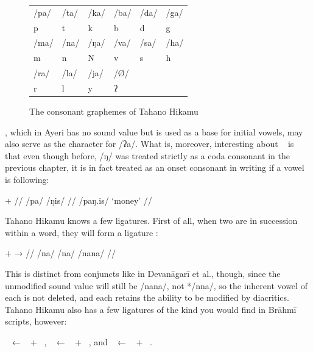 \begin{figure}[ht]
\caption{The consonant graphemes of Tahano Hikamu}

\begin{tabu} to \linewidth{X[c] X[c] X[c] X[c] X[c] X[c]}
\toprule
\tableheaderfont	/pa/ & /ta/ & /ka/ & /ba/ & /da/ & /ga/ \\
\rowfont{\Tagati\huge}	p & t & k & b & d & g \\

\midrule

\tableheaderfont	/ma/ & /na/ & /ŋa/ & /va/ & /sa/ & /ha/ \\
\rowfont{\Tagati\huge}	m & n & N & v & s & h \\

\midrule

\tableheaderfont	/ra/ & /la/ & /ja/ & /Ø/ \\
\rowfont{\Tagati\huge}	r & l & y & ʔ \\

\bottomrule
\end{tabu}
\label{fig:thcons}
\end{figure}

, which in Ayeri has no sound value but is used as a base for initial 
vowels, may also serve as the character for /ʔa/. What is, moreover, 
interesting about ~ is that even though before, /ŋ/ was treated 
strictly as a coda consonant in the previous chapter, it is in fact treated as 
an onset consonant in writing if a vowel is following:

\ex[lingstyle=thex]\begingl
	\gla {}	$+$	 //
	\glb /pa/	{}	/ŋis/ //
	\glft {} /paŋ.is/ `money' //
\endgl\xe

Tahano Hikamu knows a few ligatures. First of all, when two   
are in succession within a word, they will form a ligature  :

\ex[lingstyle=thex]\begingl
	\gla {}	$+$		→	 //
	\glb /na/	{}	/na/	{}	/nana/ //
\endgl\xe

\noindent This is distinct from conjuncts like in Devanāgarī et al., though, 
since the unmodified sound value will still be /nana/, not */nna/, so the 
inherent vowel of each   is not deleted, and each  
 retains the ability to be modified by diacritics. Tahano Hikamu also 
has a few ligatures of the kind you would find in Brāhmī scripts, however:

\pex
	\a {}~ ← ~ + ~,
	\a {}~ ← ~ + ~, and 
	\a {}~ ← ~ + ~.
\xe


